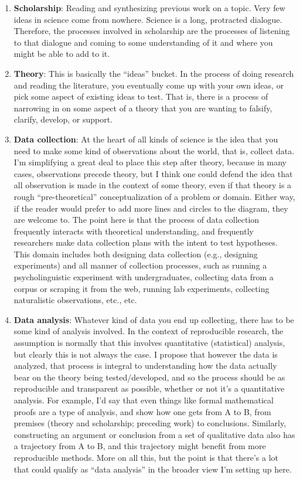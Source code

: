 \documentclass{book}
\begin{document}
\begin{enumerate}
\item \textbf{Scholarship}: Reading and synthesizing previous work on a topic. Very few ideas in science come from nowhere.  Science is a long, protracted dialogue.  Therefore, the processes involved in scholarship are the processes of listening to that dialogue and coming to some understanding of it and where you might be able to add to it.
\item \textbf{Theory}: This is basically the ``ideas'' bucket. In the process of doing research and reading the literature, you eventually come up with your own ideas, or pick some aspect of existing ideas to test. That is, there is a process of narrowing in on some aspect of a theory that you are wanting to falsify, clarify, develop, or support.
\item \textbf{Data collection}: At the heart of all kinds of science is the idea that you need to make some kind of observations about the world, that is, collect data. I'm simplifying a great deal to place this step after theory, because in many cases, observations precede theory, but I think one could defend the idea that all observation is made in the context of some theory, even if that theory is a rough ``pre-theoretical'' conceptualization of a problem or domain.  Either way, if the reader would prefer to add more lines and circles to the diagram, they are welcome to. The point here is that the process of data collection frequently interacts with theoretical understanding, and frequently researchers make data collection plans with the intent to test hypotheses.  This domain includes both designing data collection (e.g., designing experiments) and all manner of collection processes, such as running a psycholinguistic experiment with undergraduates, collecting data from a corpus or scraping it from the web, running lab experiments, collecting naturalistic observations, etc., etc.
\item \textbf{Data analysis}: Whatever kind of data you end up collecting, there has to be some kind of analysis involved. In the context of reproducible research, the assumption is normally that this involves quantitative (statistical) analysis, but clearly this is not always the case. I propose that however the data is analyzed, that process is integral to understanding how the data actually bear on the theory being tested/developed, and so the process should be as reproducible and transparent as possible, whether or not it's a quantitative analysis. For example, I'd say that even things like formal mathematical proofs are a type of analysis, and show how one gets from A to B, from premises (theory and scholarship; preceding work) to conclusions. Similarly, constructing an argument or conclusion from a set of qualitative data also has a trajectory from A to B, and this trajectory might benefit from more reproducible methods. More on all this, but the point is that there's a lot that could qualify as ``data analysis'' in the broader view I'm setting up here.

\end{enumerate}
\end{document}
